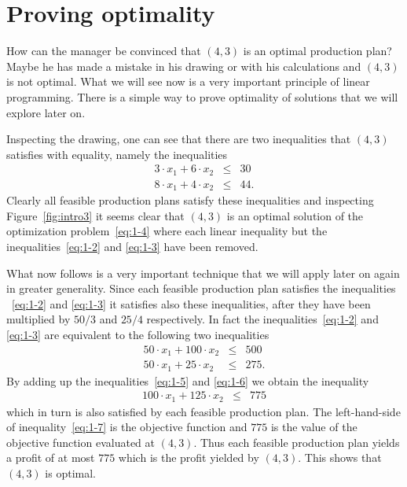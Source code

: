 \section{Proving optimality}
\label{sec:proving-optimality}


How can the manager be convinced that $(4,3)$ is an optimal production
plan? Maybe he has made a mistake in his drawing or with his
calculations and $(4,3)$ is not optimal. What we will see now is a
very important principle of linear programming. There is a simple way
to prove optimality of solutions that we will explore later on. 

Inspecting the drawing, one can see that there are two inequalities that $(4,3)$ satisfies with equality, namely the inequalities 
\begin{eqnarray}
\label{eq:1-2}
    3\cdot x_1 + 6 \cdot x_2 & \leq & 30 \\
     8\cdot x_1 + 4 \cdot x_2 & \leq & 44.  \label{eq:1-3}
\end{eqnarray}
Clearly all feasible production plans satisfy these inequalities and
inspecting Figure~\ref{fig:intro3} it seems clear that $(4,3)$ is an
optimal solution of the optimization problem~\eqref{eq:1-4} where each
linear inequality but the inequalities~\eqref{eq:1-2} and
\eqref{eq:1-3} have been removed. 

What now follows is a very important technique that we will apply later on again in greater generality. Since each feasible production plan satisfies the inequalities ~\eqref{eq:1-2} and
\eqref{eq:1-3} it satisfies also these inequalities, after they have been multiplied by $50/3$ and $25/4$ respectively. In fact the inequalities~\eqref{eq:1-2} and
\eqref{eq:1-3} are equivalent to the following two inequalities 
\begin{eqnarray}
\label{eq:1-5}
    50\cdot x_1 + 100 \cdot x_2 & \leq & 500 \\
     50\cdot x_1 + 25 \cdot x_2 & \leq & 275.  \label{eq:1-6}
\end{eqnarray}
By adding up the inequalities~\eqref{eq:1-5} and \eqref{eq:1-6} we obtain the inequality 
\begin{eqnarray}
  \label{eq:1-7}
  100\cdot x_1 + 125 \cdot x_2 & \leq & 775
\end{eqnarray}
which in turn is also satisfied by each feasible production plan. The
left-hand-side of inequality~\eqref{eq:1-7} is the objective function
and $775$ is the value of the objective function evaluated at
$(4,3)$. Thus each feasible production plan yields a profit of at most
$775$ which is the profit yielded by $(4,3)$. This shows that $(4,3)$
is optimal. 





